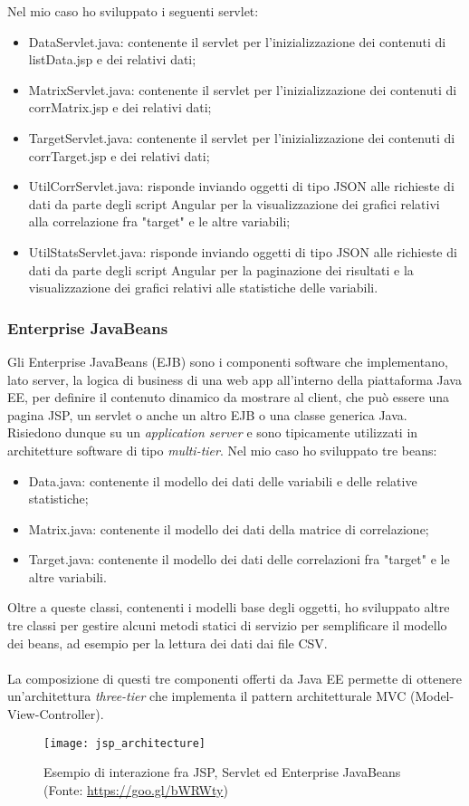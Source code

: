 Nel mio caso ho sviluppato i seguenti servlet:
\begin{itemize}
	\item DataServlet.java: contenente il servlet per l'inizializzazione  dei contenuti di listData.jsp e dei relativi dati;
	\item MatrixServlet.java: contenente il servlet per l'inizializzazione  dei contenuti di corrMatrix.jsp e dei relativi dati;
	\item TargetServlet.java: contenente il servlet per l'inizializzazione  dei contenuti di corrTarget.jsp e dei relativi dati;
	\item UtilCorrServlet.java: risponde inviando oggetti di tipo \gls{JSON} alle richieste di dati da parte degli script Angular per la visualizzazione dei grafici relativi alla correlazione fra "target" e le altre variabili;
	\item UtilStatsServlet.java: risponde inviando oggetti di tipo \gls{JSON} alle richieste di dati da parte degli script Angular per la paginazione dei risultati e la visualizzazione dei grafici relativi alle statistiche delle variabili.
\end{itemize}

\subsubsection{Enterprise JavaBeans}
Gli Enterprise JavaBeans (EJB) sono i componenti software che implementano, lato server, la logica di business di una \gls{web app} all'interno della piattaforma Java EE, per definire il contenuto dinamico da mostrare al client, che può essere una pagina JSP, un servlet o anche un altro EJB o una classe generica Java. Risiedono dunque su un \textit{application server} e sono tipicamente utilizzati in architetture software di tipo \textit{multi-tier}.
Nel mio caso ho sviluppato tre beans:
\begin{itemize}
	\item Data.java: contenente il modello dei dati delle variabili e delle relative statistiche;
	\item Matrix.java: contenente il modello dei dati della matrice di correlazione;
	\item Target.java: contenente il modello dei dati delle correlazioni fra "target" e le altre variabili.
\end{itemize}

Oltre a queste classi, contenenti i modelli base degli oggetti, ho sviluppato altre tre classi per gestire alcuni metodi statici di servizio per semplificare il modello dei beans, ad esempio per la lettura dei dati dai file \gls{CSV}.\\\\
La composizione di questi tre componenti offerti da Java EE permette di ottenere un'architettura \textit{three-tier} che implementa il pattern architetturale MVC (Model-View-Controller).
\begin{figure}[!h]
	\centering
	\texttt{[image: jsp\_architecture]}
	\caption{Esempio di interazione fra JSP, Servlet ed Enterprise JavaBeans (Fonte: \href{https://goo.gl/bWRWty}{https://goo.gl/bWRWty})}
\end{figure}
\newpage
